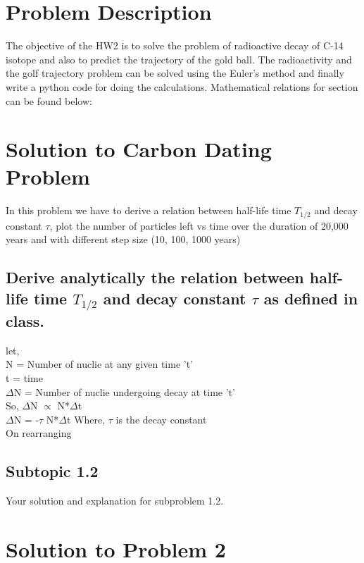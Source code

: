 \documentclass[12pt]{article}
\begin{document}
\section{Problem Description}
The objective of the HW2 is to solve the problem of radioactive decay of C-14 isotope and also to predict the trajectory of the gold ball. The radioactivity and the golf trajectory problem can be solved using the Euler's method and finally write a python code for doing the calculations.  Mathematical relations for section can be found below:

\section{Solution to Carbon Dating Problem}

In this problem we have to derive a relation between half-life time $T_{1/2}$ and decay constant $\tau$,  plot the number of particles left vs time over the duration of 20,000 years and with different step size (10, 100, 1000 years)

\subsection{Derive analytically the relation between half-life time $T_{1/2}$ and decay constant $\tau$ as defined in class.}
let,\\ 
N = Number of nuclie at any given time 't'\\
t = time\\
$\Delta$N = Number of nuclie undergoing decay at time 't'\\
So, $\Delta$N $\propto $ N*$\Delta$t\\
$\Delta$N = -$\tau$ N*$\Delta$t {Where, $\tau$ is the decay constant}\\
On rearranging



\begin{figure}[h]

\end{figure}

\subsection{Subtopic 1.2}
Your solution and explanation for subproblem 1.2.

\section{Solution to Problem 2}
\end{document}
